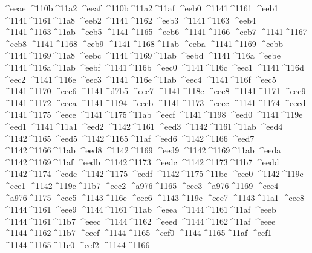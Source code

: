 \checkit ^^^^eeae ^^^^110b^^^^11a2
\checkit ^^^^eeaf ^^^^110b^^^^11a2^^^^11af
\checkit ^^^^eeb0 ^^^^1141^^^^1161
\checkit ^^^^eeb1 ^^^^1141^^^^1161^^^^11a8
\checkit ^^^^eeb2 ^^^^1141^^^^1162
\checkit ^^^^eeb3 ^^^^1141^^^^1163
\checkit ^^^^eeb4 ^^^^1141^^^^1163^^^^11ab
\checkit ^^^^eeb5 ^^^^1141^^^^1165
\checkit ^^^^eeb6 ^^^^1141^^^^1166
\checkit ^^^^eeb7 ^^^^1141^^^^1167
\checkit ^^^^eeb8 ^^^^1141^^^^1168
\checkit ^^^^eeb9 ^^^^1141^^^^1168^^^^11ab
\checkit ^^^^eeba ^^^^1141^^^^1169
\checkit ^^^^eebb ^^^^1141^^^^1169^^^^11a8
\checkit ^^^^eebc ^^^^1141^^^^1169^^^^11ab
\checkit ^^^^eebd ^^^^1141^^^^116a
\checkit ^^^^eebe ^^^^1141^^^^116a^^^^11ab
\checkit ^^^^eebf ^^^^1141^^^^116b
\checkit ^^^^eec0 ^^^^1141^^^^116c
\checkit ^^^^eec1 ^^^^1141^^^^116d
\checkit ^^^^eec2 ^^^^1141^^^^116e
\checkit ^^^^eec3 ^^^^1141^^^^116e^^^^11ab
\checkit ^^^^eec4 ^^^^1141^^^^116f
\checkit ^^^^eec5 ^^^^1141^^^^1170
\checkit ^^^^eec6 ^^^^1141^^^^d7b5
\checkit ^^^^eec7 ^^^^1141^^^^118c
\checkit ^^^^eec8 ^^^^1141^^^^1171
\checkit ^^^^eec9 ^^^^1141^^^^1172
\checkit ^^^^eeca ^^^^1141^^^^1194
\checkit ^^^^eecb ^^^^1141^^^^1173
\checkit ^^^^eecc ^^^^1141^^^^1174
\checkit ^^^^eecd ^^^^1141^^^^1175
\checkit ^^^^eece ^^^^1141^^^^1175^^^^11ab
\checkit ^^^^eecf ^^^^1141^^^^1198
\checkit ^^^^eed0 ^^^^1141^^^^119e
\checkit ^^^^eed1 ^^^^1141^^^^11a1
\checkit ^^^^eed2 ^^^^1142^^^^1161
\checkit ^^^^eed3 ^^^^1142^^^^1161^^^^11ab
\checkit ^^^^eed4 ^^^^1142^^^^1165
\checkit ^^^^eed5 ^^^^1142^^^^1165^^^^11af
\checkit ^^^^eed6 ^^^^1142^^^^1166
\checkit ^^^^eed7 ^^^^1142^^^^1166^^^^11ab
\checkit ^^^^eed8 ^^^^1142^^^^1169
\checkit ^^^^eed9 ^^^^1142^^^^1169^^^^11ab
\checkit ^^^^eeda ^^^^1142^^^^1169^^^^11af
\checkit ^^^^eedb ^^^^1142^^^^1173
\checkit ^^^^eedc ^^^^1142^^^^1173^^^^11b7
\checkit ^^^^eedd ^^^^1142^^^^1174
\checkit ^^^^eede ^^^^1142^^^^1175
\checkit ^^^^eedf ^^^^1142^^^^1175^^^^11bc
\checkit ^^^^eee0 ^^^^1142^^^^119e
\checkit ^^^^eee1 ^^^^1142^^^^119e^^^^11b7
\checkit ^^^^eee2 ^^^^a976^^^^1165
\checkit ^^^^eee3 ^^^^a976^^^^1169
\checkit ^^^^eee4 ^^^^a976^^^^1175
\checkit ^^^^eee5 ^^^^1143^^^^116e
\checkit ^^^^eee6 ^^^^1143^^^^119e
\checkit ^^^^eee7 ^^^^1143^^^^11a1
\checkit ^^^^eee8 ^^^^1144^^^^1161
\checkit ^^^^eee9 ^^^^1144^^^^1161^^^^11ab
\checkit ^^^^eeea ^^^^1144^^^^1161^^^^11af
\checkit ^^^^eeeb ^^^^1144^^^^1161^^^^11b7
\checkit ^^^^eeec ^^^^1144^^^^1162
\checkit ^^^^eeed ^^^^1144^^^^1162^^^^11af
\checkit ^^^^eeee ^^^^1144^^^^1162^^^^11b7
\checkit ^^^^eeef ^^^^1144^^^^1165
\checkit ^^^^eef0 ^^^^1144^^^^1165^^^^11af
\checkit ^^^^eef1 ^^^^1144^^^^1165^^^^11c0
\checkit ^^^^eef2 ^^^^1144^^^^1166
